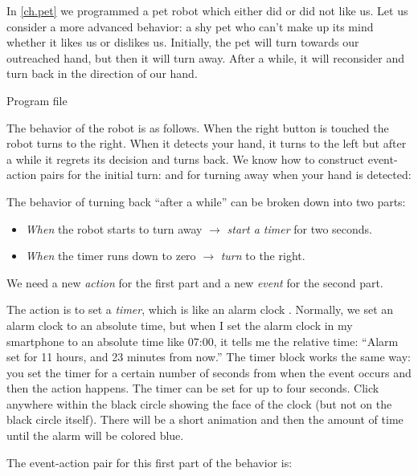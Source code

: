 

In \cref{ch.pet} we programmed a pet robot which either did or did
not like us. Let us consider a more advanced behavior: a shy pet who
can't make up its mind whether it likes us or dislikes us. Initially,
the pet will turn towards our outreached hand, but then it will turn
away. After a while, it will reconsider and turn back in the direction
of our hand.

{\raggedleft \hfill Program file }

The behavior of the robot is as follows. When the right button is
touched the robot turns to the right. When it detects your hand, it
turns to the left but after a while it regrets its decision and turns
back. We know how to construct event-action pairs for the initial turn:
 and for turning away when your hand is detected:

The behavior of turning back ``after a while'' can be broken down into
two parts:

\begin{itemize}

\item \emph{When} the robot starts to turn away $\rightarrow$
\emph{start a timer} for two seconds.

\item \emph{When} the timer runs down to zero $\rightarrow$ \emph{turn}
to the right.

\end{itemize}

We need a new \emph{action} for the first part and a new
\emph{event} for the second part.

The action is to set a \emph{timer}, which is like an alarm clock
. Normally, we set an alarm clock to an absolute time,
but when I set the alarm clock in my smartphone to an absolute time like
07:00, it tells me the relative time: ``Alarm set for 11 hours, and 23
minutes from now.'' The timer block works the same way: you set the
timer for a certain number of seconds from when the event occurs and then the
action happens. The timer can be set for up to four seconds. Click
anywhere within the black circle showing the face of the clock (but not
on the black circle itself). There will be a short animation and then
the amount of time until the alarm will be colored blue.

\newpage
The event-action pair for this first part of the behavior is:

